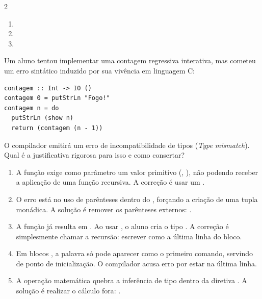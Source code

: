 \documentclass[a4paper,10pt,brazil]{article}
\begin{document}
\begin{multicols}{2}
\begin{enumerate}
  \item {}

  \item {}

  \item {}


\end{enumerate}

Um aluno tentou implementar uma contagem regressiva interativa, mas cometeu um erro sintático induzido por sua vivência em linguagem C:

\begin{verbatim}
contagem :: Int -> IO ()
contagem 0 = putStrLn "Fogo!"
contagem n = do
  putStrLn (show n)
  return (contagem (n - 1))
\end{verbatim}

O compilador emitirá um erro de incompatibilidade de tipos (\emph{Type mismatch}). Qual é a justificativa rigorosa para isso e como consertar?

\begin{enumerate}
  \item A função  exige como parâmetro um valor primitivo (, ), não podendo receber a aplicação de uma função recursiva. A correção é usar um .

  \item O erro está no uso de parênteses dentro do , forçando a criação de uma tupla monádica. A solução é remover os parênteses externos: .

  \item A função  já resulta em . Ao usar , o aluno cria o tipo . A correção é simplesmente chamar a recursão: escrever  como a última linha do bloco.

  \item Em blocos , a palavra  só pode aparecer como o primeiro comando, servindo de ponto de inicialização. O compilador acusa erro por estar na última linha.

  \item A operação matemática  quebra a inferência de tipo dentro da diretiva . A solução é realizar o cálculo fora: .


\end{enumerate}
\end{multicols}
\end{document}
